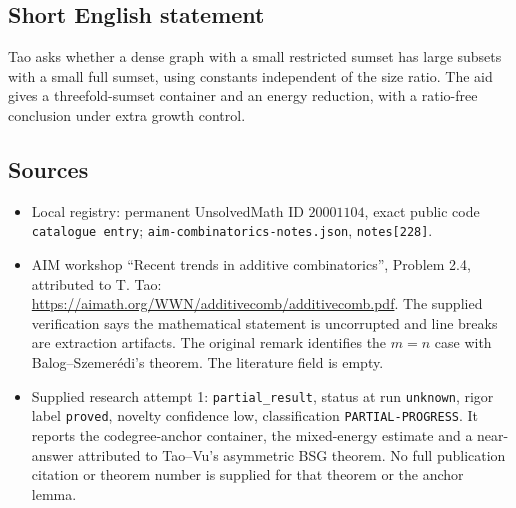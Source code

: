 \documentclass[11pt]{article}
\begin{document}
\subsection{Short English statement}
Tao asks whether a dense graph with a small restricted sumset has large subsets with a small full sumset, using constants independent of the size ratio. The aid gives a threefold-sumset container and an energy reduction, with a ratio-free conclusion under extra growth control.
\subsection{Sources}
\begin{itemize}
\item Local registry: permanent UnsolvedMath ID \(20001104\), exact public code \texttt{catalogue entry}; \texttt{aim-combinatorics-notes.json}, \texttt{notes[228]}.
\item AIM workshop ``Recent trends in additive combinatorics'', Problem 2.4, attributed to T. Tao: \url{https://aimath.org/WWN/additivecomb/additivecomb.pdf}. The supplied verification says the mathematical statement is uncorrupted and line breaks are extraction artifacts. The original remark identifies the \(m=n\) case with Balog--Szemerédi's theorem. The literature field is empty.
\item Supplied research attempt 1: \texttt{partial\_result}, status at run \texttt{unknown}, rigor label \texttt{proved}, novelty confidence low, classification \texttt{PARTIAL-PROGRESS}. It reports the codegree-anchor container, the mixed-energy estimate and a near-answer attributed to Tao--Vu's asymmetric BSG theorem. No full publication citation or theorem number is supplied for that theorem or the anchor lemma.
\end{itemize}
\end{document}
